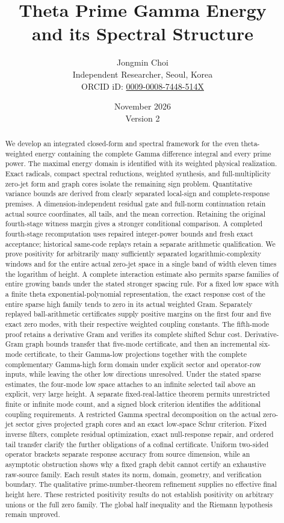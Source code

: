 \documentclass[11pt,a4paper]{article}
\title{Theta Prime Gamma Energy\\and its Spectral Structure}
\author{Jongmin Choi\\[3pt]\small Independent Researcher, Seoul, Korea\\\small ORCID iD: \href{https://orcid.org/0009-0008-7448-514X}{0009-0008-7448-514X}}
\date{November 2026\\Version 2}
\numberwithin{equation}{section}
\theoremstyle{definition}\newtheorem{definition}[theorem]{Definition}
\theoremstyle{remark}\newtheorem{remark}[theorem]{Remark}
\begin{document}
\maketitle
\begin{abstract}
We develop an integrated closed-form and spectral framework for the even theta-weighted energy containing the complete Gamma difference integral and every prime power. The maximal energy domain is identified with its weighted physical realization. Exact radicals, compact spectral reductions, weighted synthesis, and full-multiplicity zero-jet form and graph cores isolate the remaining sign problem. Quantitative variance bounds are derived from clearly separated local-sign and complete-response premises. A dimension-independent residual gate and full-norm continuation retain actual source coordinates, all tails, and the mean correction. Retaining the original fourth-stage witness margin gives a stronger conditional comparison. A completed fourth-stage recomputation uses repaired integer-power bounds and fresh exact acceptance; historical same-code replays retain a separate arithmetic qualification. We prove positivity for arbitrarily many sufficiently separated logarithmic-complexity windows and for the entire actual zero-jet space in a single band of width eleven times the logarithm of height. A complete interaction estimate also permits sparse families of entire growing bands under the stated stronger spacing rule. For a fixed low space with a finite theta exponential-polynomial representation, the exact response cost of the entire sparse high family tends to zero in its actual weighted Gram. Separately replayed ball-arithmetic certificates supply positive margins on the first four and five exact zero modes, with their respective weighted coupling constants. The fifth-mode proof retains a derivative Gram and verifies its complete shifted Schur cost. Derivative-Gram graph bounds transfer that five-mode certificate, and then an incremental six-mode certificate, to their Gamma-low projections together with the complete complementary Gamma-high form domain under explicit sector and operator-row inputs, while leaving the other low directions unresolved. Under the stated sparse estimates, the four-mode low space attaches to an infinite selected tail above an explicit, very large height. A separate fixed-real-lattice theorem permits unrestricted finite or infinite mode count, and a signed block criterion identifies the additional coupling requirements. A restricted Gamma spectral decomposition on the actual zero-jet sector gives projected graph cores and an exact low-space Schur criterion. Fixed inverse filters, complete residual optimization, exact null-response repair, and ordered tail transfer clarify the further obligations of a cofinal certificate. Uniform two-sided operator brackets separate response accuracy from source dimension, while an asymptotic obstruction shows why a fixed graph debit cannot certify an exhaustive raw-source family. Each result states its norm, domain, geometry, and verification boundary. The qualitative prime-number-theorem refinement supplies no effective final height here. These restricted positivity results do not establish positivity on arbitrary unions or the full zero family. The global half inequality and the Riemann hypothesis remain unproved.

\end{abstract}
\end{document}
